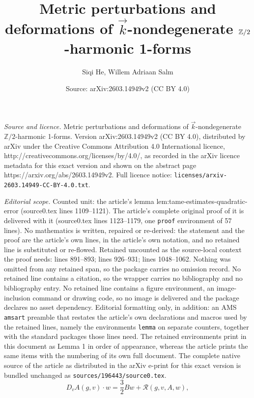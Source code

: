 \documentclass[10pt,a4paper]{amsart}
\title{Metric perturbations and deformations of \texorpdfstring{$\vec{k}$}{k}-nondegenerate $\ZT$-harmonic 1-forms}
\author{Siqi He, Willem Adriaan Salm}
\date{Source: arXiv:2603.14949v2 (CC BY 4.0)}
\newcommand{\ZT}{\mathbb{Z}/2}
\begin{document}
\maketitle

\noindent\emph{Source and licence.} Metric perturbations and deformations of \texorpdfstring{$\vec{k}$}{k}-nondegenerate $\ZT$-harmonic 1-forms. Version arXiv:2603.14949v2 (CC BY 4.0), distributed by arXiv under the Creative Commons Attribution 4.0 International licence, http://creativecommons.org/licenses/by/4.0/, as recorded in the arXiv licence metadata for this exact version and shown on the abstract page https://arxiv.org/abs/2603.14949v2. Full licence notice: \texttt{licenses/arxiv-2603.14949-CC-BY-4.0.txt}.\par\smallskip

\noindent\textit{Editorial scope.} Counted unit: the article's lemma lem:tame-estimates-quadratic-error (source0.tex lines 1109--1121). The article's complete original proof of it is delivered with it (source0.tex lines 1123--1179, one \texttt{proof} environment of 57 lines). No mathematics is written, repaired or re-derived: the statement and the proof are the article's own lines, in the article's own notation, and no retained line is substituted or re-flowed.  Retained uncounted as the source-local context the proof needs: lines 891--893; lines 926--931; lines 1048--1062.  Nothing was omitted from any retained span, so the package carries no omission record.  No retained line contains a citation, so the wrapper carries no bibliography and no bibliography entry.  No retained line contains a figure environment, an image-inclusion command or drawing code, so no image is delivered and the package declares no asset dependency.  Editorial formatting only, in addition: an AMS \texttt{amsart} preamble that restates the article's own declarations and macros used by the retained lines, namely the environments \texttt{lemma} on separate counters, together with the standard packages those lines need.  The retained environments print in this document as Lemma 1 in order of appearance, whereas the article prints the same items with the numbering of its own full document.  The complete native source of the article as distributed in the arXiv e-print for this exact version is bundled unchanged as \texttt{sources/196443/source0.tex}.
\begin{equation} \label{eq:linearization}
	D_v A(g, v) \cdot w = \frac{3}{2} B w + \mathcal{R}(g, v, A, w),
\end{equation}
\end{document}
